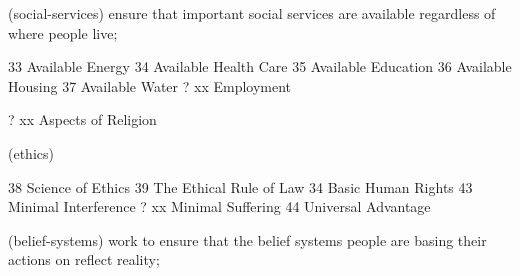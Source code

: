 (social-services) ensure that important social services are available regardless of where people live;

	33  Available Energy
	34  Available Health Care
	35  Available Education
	36  Available Housing
	37  Available Water
?	xx  Employment   %

?	xx  Aspects of Religion   %

(ethics)

	38  Science of Ethics
	39  The Ethical Rule of Law
	34  Basic Human Rights
	43  Minimal Interference
?	xx  Minimal Suffering   %
	44  Universal Advantage

(belief-systems) work to ensure that the belief systems people are basing their actions on reflect reality;

